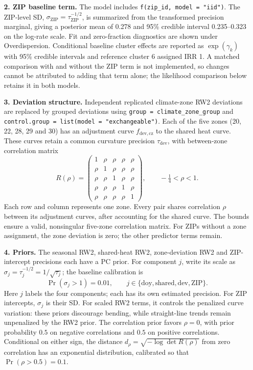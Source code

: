 \documentclass[10pt]{article}
\begin{document}
\textbf{2. ZIP baseline term.}
The model includes \texttt{f(zip\_id, model = "iid")}.
The ZIP-level SD, $\sigma_{\mathrm{ZIP}}=\tau_{\mathrm{ZIP}}^{-1/2}$,
is summarized from the transformed precision marginal, giving a posterior
mean of 0.278 and 95\% credible interval 0.235--0.323 on the log-rate scale.
Fit and zero-fraction diagnostics are shown under Overdispersion.
Conditional baseline cluster effects are reported as $\exp(\gamma_k)$ with 95\% credible
intervals and reference cluster 6 assigned IRR 1. A matched comparison
with and without the ZIP term is not implemented, so changes cannot be
attributed to adding that term alone; the likelihood comparison below
retains it in both models.

\textbf{3. Deviation structure.}
Independent replicated climate-zone RW2 deviations are replaced by grouped
deviations using \texttt{group = climate\_zone\_group} and
\texttt{control.group = list(model = "exchangeable")}.
Each of the five zones (20, 22, 28, 29 and 30) has an adjustment curve
$f_{\mathrm{dev},\mathrm{cz}}$ to the shared heat curve. These curves retain
a common curvature precision $\tau_{\mathrm{dev}}$, with between-zone
correlation matrix
\[
R(\rho)=
\begin{pmatrix}
1&\rho&\rho&\rho&\rho\\
\rho&1&\rho&\rho&\rho\\
\rho&\rho&1&\rho&\rho\\
\rho&\rho&\rho&1&\rho\\
\rho&\rho&\rho&\rho&1
\end{pmatrix},
\qquad -\tfrac14<\rho<1.
\]
Each row and column represents one zone. Every pair shares correlation
$\rho$ between its adjustment curves, after accounting for the shared
curve. The bounds ensure a valid, nonsingular five-zone correlation matrix.
For ZIPs without a zone assignment, the zone deviation is zero; the other
predictor terms remain.

\textbf{4. Priors.}
The seasonal RW2, shared-heat RW2, zone-deviation RW2 and ZIP-intercept
precisions each have a PC prior. For component $j$, write its scale as
$\sigma_j=\tau_j^{-1/2}=1/\sqrt{\tau_j}$; the baseline calibration is
\[
\Pr(\sigma_j>1)=0.01,\qquad
j\in\{\mathrm{doy},\mathrm{shared},\mathrm{dev},\mathrm{ZIP}\}.
\]
Here $j$ labels the four components; each has its own estimated precision.
For ZIP intercepts, $\sigma_j$ is their SD. For scaled RW2 terms, it controls
the penalized curve variation: these priors discourage bending, while
straight-line trends remain unpenalized by the RW2 prior.
The correlation prior favors $\rho=0$, with prior probability $0.5$ on
negative correlations and $0.5$ on positive correlations. Conditional on
either sign, the distance $d_\rho=\sqrt{-\log\det R(\rho)}$ from zero
correlation has an exponential distribution, calibrated so that
$\Pr(\rho>0.5)=0.1$.
\end{document}
